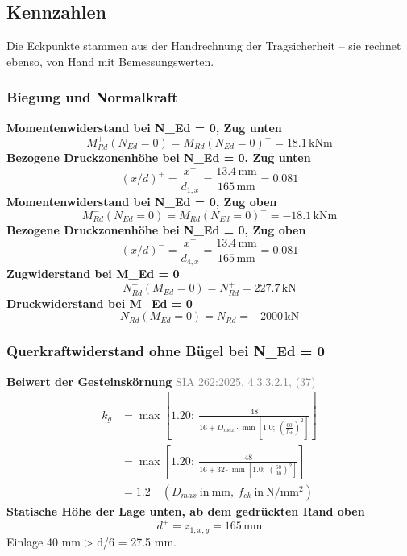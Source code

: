 \documentclass[11pt,a4paper]{article}
\newcommand{\normref}[1]{{\small\textcolor{gray}{#1}}}
\begin{document}
\subsection{Kennzahlen}
Die Eckpunkte stammen aus der Handrechnung der Tragsicherheit – sie rechnet ebenso, von Hand mit Bemessungswerten.

\subsubsection{Biegung und Normalkraft}
\noindent\textbf{Momentenwiderstand bei N\_Ed = 0, Zug unten}
\begin{equation*}
M_{Rd}^{+}(N_{Ed} = 0) = M_{Rd}(N_{Ed}=0)^{+} = 18.1\,\mathrm{kNm}
\end{equation*}
\noindent\textbf{Bezogene Druckzonenhöhe bei N\_Ed = 0, Zug unten}
\begin{equation*}
\left(x/d\right)^{+} = \frac{x^{+}}{d_{1,x}} = \frac{13.4\,\mathrm{mm}}{165\,\mathrm{mm}} = 0.081
\end{equation*}
\noindent\textbf{Momentenwiderstand bei N\_Ed = 0, Zug oben}
\begin{equation*}
M_{Rd}^{-}(N_{Ed} = 0) = M_{Rd}(N_{Ed}=0)^{-} = -18.1\,\mathrm{kNm}
\end{equation*}
\noindent\textbf{Bezogene Druckzonenhöhe bei N\_Ed = 0, Zug oben}
\begin{equation*}
\left(x/d\right)^{-} = \frac{x^{-}}{d_{4,x}} = \frac{13.4\,\mathrm{mm}}{165\,\mathrm{mm}} = 0.081
\end{equation*}
\noindent\textbf{Zugwiderstand bei M\_Ed = 0}
\begin{equation*}
N_{Rd}^{+}(M_{Ed} = 0) = N_{Rd}^{+} = 227.7\,\mathrm{kN}
\end{equation*}
\noindent\textbf{Druckwiderstand bei M\_Ed = 0}
\begin{equation*}
N_{Rd}^{-}(M_{Ed} = 0) = N_{Rd}^{-} = -2000\,\mathrm{kN}
\end{equation*}
\subsubsection{Querkraftwiderstand ohne Bügel bei N\_Ed = 0}
\noindent\textbf{Beiwert der Gesteinskörnung} \hfill \normref{SIA 262:2025, 4.3.3.2.1, (37)}
\begin{equation*}
\begin{aligned}
  k_g &= \max\left[1.20;\ \frac{48}{16 + D_{max} \cdot \min\left[1.0;\ \left(\frac{60}{f_{ck}}\right)^{2}\right]}\right] \\
  &= \max\left[1.20;\ \frac{48}{16 + 32 \cdot \min\left[1.0;\ \left(\frac{60}{30}\right)^{2}\right]}\right] \\
  &= 1.2 \quad \left(D_{max}\ \text{in}\ \mathrm{mm},\ f_{ck}\ \text{in}\ \mathrm{N}/\mathrm{mm}^{2}\right)
\end{aligned}
\end{equation*}
\noindent\textbf{Statische Höhe der Lage unten, ab dem gedrückten Rand oben}
\begin{equation*}
d^{+} = z_{1,x,g} = 165\,\mathrm{mm}
\end{equation*}
Einlage 40 mm > d/6 = 27.5 mm.
\end{document}
